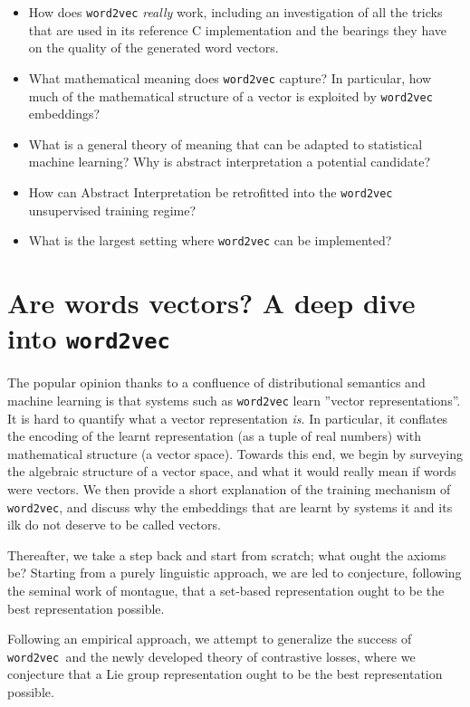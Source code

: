 \documentclass[11pt]{book}
\newcommand{\wtov}{\texttt{word2vec }}
\begin{document}
\begin{itemize}
	\item How does \texttt{word2vec} \emph{really} work, including an investigation of all the tricks that are used in its reference C implementation and the bearings they have on the quality of the generated word vectors.
	\item What mathematical meaning does \texttt{word2vec} capture? In particular, how much of the mathematical structure of a vector is exploited by \texttt{word2vec} embeddings?
	\item What is a general theory of meaning that can be adapted to statistical machine learning? Why is abstract interpretation a potential candidate?
	\item How can Abstract Interpretation be retrofitted into the  \texttt{word2vec} unsupervised training regime?
	\item What is the largest setting where \texttt{word2vec} can be implemented?
\end{itemize}



\chapter{Are words vectors? A deep dive into \wtov }

The popular opinion thanks to a confluence of distributional semantics
and machine learning is that systems such as \texttt{word2vec} learn
''vector representations''. It is hard to quantify what a vector representation \emph{is}.
In particular, it conflates the encoding of the learnt representation
(as a tuple of real numbers) with mathematical structure
(a vector space). 
Towards this end, we begin by surveying the algebraic structure of a vector
space, and what it would really mean if words were vectors. We then provide
a short explanation of the training mechanism of \texttt{word2vec}, and
discuss why the embeddings that are learnt by systems it and its ilk do not
deserve to be called vectors. 

Thereafter, we take a step back and start from scratch; what ought the axioms
be? Starting from a purely linguistic approach, we are led to conjecture, following
the seminal work of montague, that a set-based representation ought to be
the best representation possible.

Following an empirical approach, we attempt to generalize the success
of \wtov and the newly developed theory of contrastive losses, where we conjecture
that a Lie group representation ought to be the best representation possible.
\end{document}
